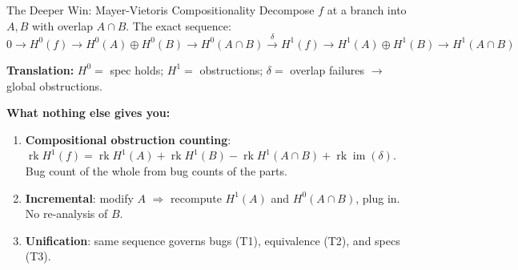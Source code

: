 \documentclass[aspectratio=169,10pt]{beamer}
\begin{document}
\begin{frame}{The Deeper Win: Mayer-Vietoris Compositionality}
Decompose $f$ at a branch into $A, B$ with overlap $A \cap B$.
The exact sequence:
\vspace{-0.3em}
{\small\[
0 \!\to\! H^0(f) \!\to\! H^0(A) \!\oplus\! H^0(B) \!\to\! H^0(A\!\cap\! B)
\xrightarrow{\delta}
H^1(f) \!\to\! H^1(A) \!\oplus\! H^1(B) \!\to\! H^1(A\!\cap\! B)
\]}
\vspace{-0.5em}

\textbf{Translation:}
$H^0 =$ spec holds;\;
$H^1 =$ obstructions;\;
$\delta =$ overlap failures $\to$ global obstructions.

\vspace{0.3em}
\textbf{What nothing else gives you:}
\begin{enumerate}\small
  \item \textbf{Compositional obstruction counting}:
        $\operatorname{rk} H^1\!(f) = \operatorname{rk} H^1\!(A) +
        \operatorname{rk} H^1\!(B) - \operatorname{rk} H^1\!(A\!\cap\! B)
        + \operatorname{rk}\operatorname{im}(\delta)$.\\
        Bug count of the whole from bug counts of the parts.
  \item \textbf{Incremental}: modify $A$ $\Rightarrow$ recompute
        $H^1\!(A)$ and $H^0\!(A\!\cap\! B)$, plug in. No re-analysis of $B$.
  \item \textbf{Unification}: same sequence governs bugs (T1),
        equivalence (T2), and specs (T3).
\end{enumerate}
\end{frame}
\end{document}
